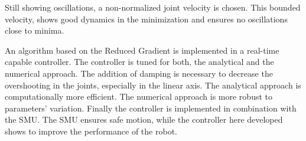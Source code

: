 Still showing oscillations, a  non-normalized joint velocity is chosen. This bounded velocity,  shows good dynamics in the minimization and ensures no oscillations close to minima.

An algorithm based on the Reduced  Gradient is implemented in a real-time capable controller. The controller is tuned for both, the analytical and the numerical approach. The addition of damping is necessary to decrease the overshooting in the joints, especially in the linear axis. The analytical approach is  computationally more efficient. The numerical approach is more robust to parameters' variation.
Finally the controller is implemented in combination with the SMU. The SMU ensures safe motion, while the controller here developed shows to improve the performance of the robot.



%
%
